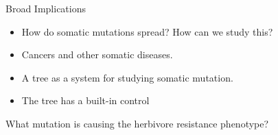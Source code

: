 \documentclass{beamer}
\begin{document}
\begin{frame}{Broad Implications}
	\begin{itemize}
	\item How do somatic mutations spread? How can we study this?
	\item Cancers and other somatic diseases.
	\item A tree as a system for studying somatic mutation.
	\item The tree has a built-in control
	\end{itemize}



\end{frame}

\begin{frame}{What mutation is causing the herbivore resistance phenotype?}
\begin{center}
\end{center}
\end{frame}
\end{document}
